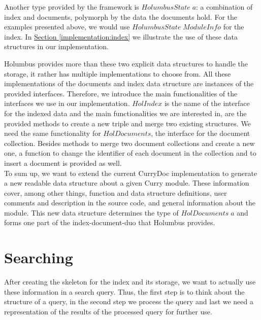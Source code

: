 \documentclass[%
	latex,%
	a4paper,%
	oneside,%
	chapterprefix,%
	headsepline,%
	12pt%
]{scrbook}
\newcommand{\Conid}[1]{\mathit{#1}}
\newcommand{\Varid}[1]{\mathit{#1}}
\begin{document}
Another type provided by the framework is \ensuremath{\Conid{HolumbusState}\;\Varid{a}}: a
combination of index and documents, polymorph by the data the documents
hold. %
For the examples presented above, we would use \ensuremath{\Conid{HolumbusState}\;\Conid{ModuleInfo}} for the index. %
In \hyperref[implementation:index]{Section \ref{implementation:index}}
we illustrate the use of these data structures in our implementation.

Holumbus provides more than these two explicit data structures to
handle the storage, it rather has multiple implementations to choose
from. %
All these implementations of the documents and index data structure
are instances of the provided interfaces. %
Therefore, we introduce the main functionalities of the interfaces we
use in our implementation. %
\ensuremath{\Conid{HolIndex}} is the name of the interface for the indexed data and the
main functionalities we are interested in, are the provided methods to
create a new triple and merge two existing structures. %
We need the same functionality for \ensuremath{\Conid{HolDocuments}}, the interface for
the document collection. %
Besides methods to merge two document collections and create a new one,
a function to change the identifier of each document in the collection
and to insert a document is provided as well.\\

To sum up, we want to extend the current CurryDoc implementation to
generate a new readable data structure about a given Curry module. %
These information cover, among other things, function and data
structure definitions, user comments and description in the source
code, and general information about the module. %
This new data structure determines the type of \ensuremath{\Conid{HolDocuments}\;\Varid{a}} and
forms one part of the index-document-duo that Holumbus provides. %


\section{Searching}
After creating the skeleton for the index and its storage, we want to
actually use these information in a search query. %
Thus, the first step is to think about the structure of a query, in the
second step we process the query and last we need a representation of
the results of the processed query for further use.\\
\end{document}
